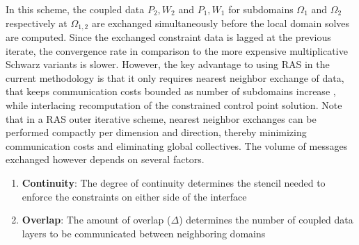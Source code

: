 \documentclass[conference]{IEEEtran}
\newcommand{\eqt}[1]{Equation~(\ref{#1})}
\begin{document}
In this scheme, the coupled data $P_2, W_2$ and $P_1, W_1$ for subdomains $\Omega_1$ and $\Omega_2$ respectively at $\Omega_{1,2}$ are exchanged simultaneously before the local domain solves are computed. Since the exchanged constraint data is lagged at the previous iterate, the convergence rate in comparison to the more expensive multiplicative Schwarz variants \cite{smith-ddm} is slower. However, the key advantage to using RAS in the current methodology is that it only requires nearest neighbor exchange of data, that keeps communication costs bounded as number of subdomains increase \cite{orasm-as-ms-2007, gander-rasm}, while interlacing recomputation of the constrained control point solution. Note that in a RAS outer iterative scheme, nearest neighbor exchanges can be performed compactly per dimension and direction, thereby minimizing communication costs and eliminating global collectives.
%
%
The volume of messages exchanged however depends on several factors.

\begin{enumerate}
	\item \textbf{Continuity}: The degree of continuity determines the stencil needed to enforce the constraints on either side of the interface
	\item \textbf{Overlap}: The amount of overlap ($\Delta$) determines the number of coupled data layers to be communicated between neighboring domains
\end{enumerate}
\end{document}

